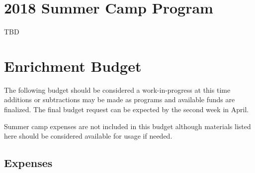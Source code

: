 \documentclass{article}
\begin{document}
\section*{2018 Summer Camp Program}
TBD

\newpage
\section*{ Enrichment Budget}
The following budget should be considered a work-in-progress at this time additions or subtractions may be made as programs and available funds are finalized. The final budget request can be expected by the second week in April.

Summer camp expenses are not included in this budget although materials listed here should be considered available for usage if needed.

\subsection*{Expenses}
\end{document}

